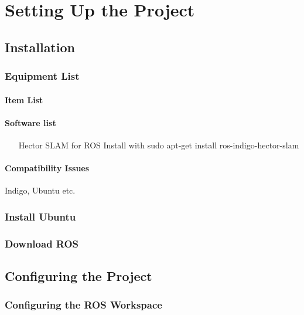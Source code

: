 \chapter{Setting Up the Project}

\section{Installation}

\subsection{Equipment List}

\subsubsection{Item List}

\subsubsection{Software list}

\begin{itemize}
	\item[Hector SLAM for ROS] Install with sudo apt-get install ros-indigo-hector-slam
\end{itemize}

\subsubsection{Compatibility Issues}

Indigo, Ubuntu etc.

\subsection{Install Ubuntu}

\subsection{Download ROS}

\section{Configuring the Project}

\subsection{Configuring the ROS Workspace}

